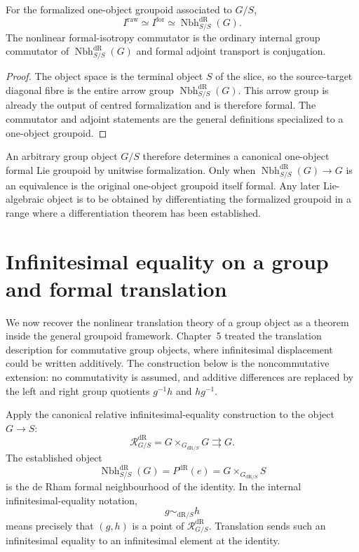 \begin{proposition}
\label{prop:one-object-isotropy}
For the formalized one-object groupoid associated to $G/S$,
\[
    I^{\mathrm{raw}}
    \simeq
    I^{\mathrm{for}}
    \simeq
    \operatorname{Nbh}^{\mathrm{dR}}_{S/S}(G).
\]
The nonlinear formal-isotropy commutator is the ordinary internal group
commutator of $\operatorname{Nbh}^{\mathrm{dR}}_{S/S}(G)$ and formal adjoint transport is
conjugation.
\end{proposition}

\begin{proof}
The object space is the terminal object $S$ of the slice, so the source-target
diagonal fibre is the entire arrow group
$\operatorname{Nbh}^{\mathrm{dR}}_{S/S}(G)$.  This arrow group is already the output of centred
formalization and is therefore formal.  The commutator and adjoint statements are
the general definitions specialized to a one-object groupoid.
\end{proof}

\begin{remark}
An arbitrary group object $G/S$ therefore determines a canonical one-object
formal Lie groupoid by unitwise formalization.  Only when
$\operatorname{Nbh}^{\mathrm{dR}}_{S/S}(G)\to G$ is an equivalence is the original
one-object groupoid itself formal.  Any later Lie-algebraic object is to be
obtained by differentiating the formalized groupoid in a range where a
differentiation theorem has been established.
\end{remark}

\section{Infinitesimal equality on a group and formal translation}
\label{sec:flg-group-translation}

We now recover the nonlinear translation theory of a group object as a theorem
inside the general groupoid framework.  Chapter~5 treated the translation
description for commutative group objects, where infinitesimal displacement
could be written additively.  The construction below is the noncommutative
extension: no commutativity is assumed, and additive differences are replaced
by the left and right group quotients $g^{-1}h$ and $hg^{-1}$.

Apply the canonical relative infinitesimal-equality construction to the object
$G\to S$:
\[
    \mathcal R^{\mathrm{dR}}_{G/S}
    =
    G\times_{G_{\mathrm{dR}/S}}G
    \rightrightarrows G.
\]
The established object
\[
    \operatorname{Nbh}^{\mathrm{dR}}_{S/S}(G)
    =
    P^{\mathrm{dR}}(e)
    =
    G\times_{G_{\mathrm{dR}/S}}S
\]
is the de Rham formal neighbourhood of the identity.
In the internal infinitesimal-equality notation,
\[
    g\sim_{\mathrm{dR}/S}h
\]
means precisely that $(g,h)$ is a point of
$\mathcal R^{\mathrm{dR}}_{G/S}$.  Translation sends such an infinitesimal equality
to an infinitesimal element at the identity.

